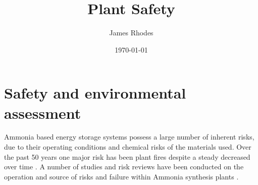 \documentclass[11pt, a4paper]{article}
\title{Plant Safety}
\author{James Rhodes}
\date{\today}
\begin{document}
{\renewcommand{\arraystretch}{1.0}
\doublespacing
\section{Safety and environmental assessment}

Ammonia based energy storage systems possess a large number of inherent risks, due to their operating conditions and chemical risks of the materials used. Over the past 50 years one major risk has been plant fires despite a steady decreased over time \cite{Ojha2010}\cite{Williams1999}. A number of studies and risk reviews have been conducted on the operation and source of risks and failure within Ammonia synthesis plants \cite{Ojha2010}.
}
\end{document}
